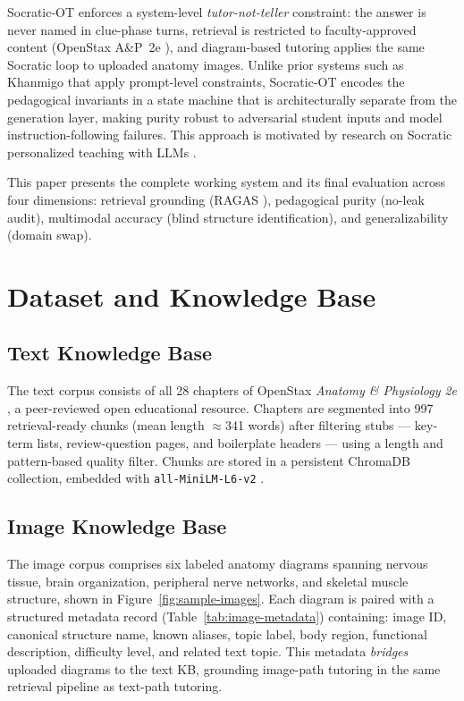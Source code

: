 \documentclass[11pt]{article}
\begin{document}
Socratic-OT enforces a system-level \emph{tutor-not-teller} constraint:
the answer is never named in clue-phase turns, retrieval is restricted to
faculty-approved content (OpenStax A\&P~2e \citep{openstax_ap2e}), and
diagram-based tutoring applies the same Socratic loop to uploaded anatomy
images.
Unlike prior systems such as Khanmigo \citep{khanmigo} that apply prompt-level
constraints, Socratic-OT encodes the pedagogical invariants in a state machine
that is architecturally separate from the generation layer, making purity
robust to adversarial student inputs and model instruction-following failures.
This approach is motivated by research on Socratic personalized teaching
with LLMs \citep{socraticlm}.

This paper presents the complete working system and its final evaluation
across four dimensions: retrieval grounding (RAGAS \citep{es2024ragas}),
pedagogical purity (no-leak audit), multimodal accuracy (blind structure
identification), and generalizability (domain swap).

\section{Dataset and Knowledge Base}

\subsection{Text Knowledge Base}

The text corpus consists of all 28 chapters of OpenStax
\emph{Anatomy \& Physiology 2e} \citep{openstax_ap2e}, a peer-reviewed open
educational resource.
Chapters are segmented into 997 retrieval-ready chunks (mean length
$\approx$341 words) after filtering stubs --- key-term lists, review-question
pages, and boilerplate headers --- using a length and pattern-based quality
filter.
Chunks are stored in a persistent ChromaDB \citep{chroma_docs} collection,
embedded with \texttt{all-MiniLM-L6-v2} \citep{allminilm_model}.

\subsection{Image Knowledge Base}

The image corpus comprises six labeled anatomy diagrams spanning
nervous tissue, brain organization, peripheral nerve networks, and skeletal
muscle structure, shown in Figure~\ref{fig:sample-images}.
Each diagram is paired with a structured metadata record (Table~\ref{tab:image-metadata})
containing: image ID, canonical structure name, known aliases, topic label,
body region, functional description, difficulty level, and related text topic.
This metadata \emph{bridges} uploaded diagrams to the text KB, grounding
image-path tutoring in the same retrieval pipeline as text-path tutoring.
\end{document}
